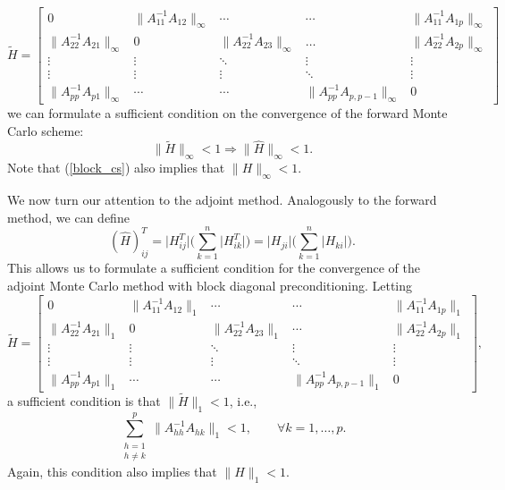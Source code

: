 \documentclass[times]{nlaauth}
\begin{document}
\[
 \tilde{H}=\begin{bmatrix}0 & \lVert A_{11}^{-1}A_{12}\rVert_{\infty} &
\cdots &
\cdots & \lVert A_{11}^{-1}A_{1p}\rVert_{\infty} \\
\lVert A_{22}^{-1}A_{21}\rVert_{\infty} & 0 & \lVert
A_{22}^{-1}A_{23}\rVert_{\infty} &
\dots & \lVert A_{22}^{-1}A_{2p}\rVert_{\infty} \\
\vdots & \vdots & \ddots & \vdots & \vdots\\
\vdots & \vdots & \vdots &\ddots & \vdots \\
\lVert A_{pp}^{-1}A_{p1}\rVert_{\infty} &  \cdots & \cdots&
\lVert A_{pp}^{-1}A_{p,p-1}\rVert_{\infty} & 0
\end{bmatrix}
\]
we can formulate a
sufficient condition on the convergence of the forward Monte
Carlo scheme:
\begin{equation}
 \lVert \tilde{H} \rVert_{\infty}<1 \Rightarrow \lVert \hat{H}
\rVert_{\infty}<1.
\end{equation}
Note that (\ref{block_cs}) also implies that $\|H\|_{\infty} < 1$.

We now turn our attention to the adjoint method.
Analogously to the forward method, we can define
\[
(\hat{H})^T_{ij} = \lvert H^T_{ij}\rvert\bigg(\sum_{k=1}^n\lvert
H^T_{ik}\rvert\bigg) = \lvert H_{ji}\rvert\bigg(\sum_{k=1}^n\lvert
H_{ki}\rvert\bigg).
\]
This allows us to formulate a sufficient condition for the convergence of
the adjoint Monte Carlo method with block diagonal preconditioning.
Letting
\[
  \tilde{H}=\begin{bmatrix}0 & \lVert A_{11}^{-1}A_{12}\rVert_{1} & \cdots
&
\cdots & \lVert A_{11}^{-1}A_{1p}\rVert_{1} \\
\lVert A_{22}^{-1}A_{21}\rVert_{1} & 0 & \lVert
A_{22}^{-1}A_{23}\rVert_{1} &
\cdots & \lVert A_{22}^{-1}A_{2p}\rVert_{1} \\
\vdots & \vdots & \ddots & \vdots & \vdots\\
\vdots & \vdots & \vdots &\ddots & \vdots \\
\lVert A_{pp}^{-1}A_{p1}\rVert_{1} &  \cdots & \cdots&
\lVert A_{pp}^{-1}A_{p,p-1}\rVert_{1} & 0
\end{bmatrix},
\]
a sufficient condition is that $\lVert \tilde{H} \rVert_{1}<1$, i.e.,
 \begin{equation}
  \sum_{\substack{h=1\\h\ne k}}^p \lVert A_{hh}^{-1}A_{hk}\rVert_1<1,
    \label{block_cs_2}\qquad \forall k=1,\ldots,p.
 \end{equation}
Again, this condition also implies that $\|H\|_1 < 1$.
\end{document}
